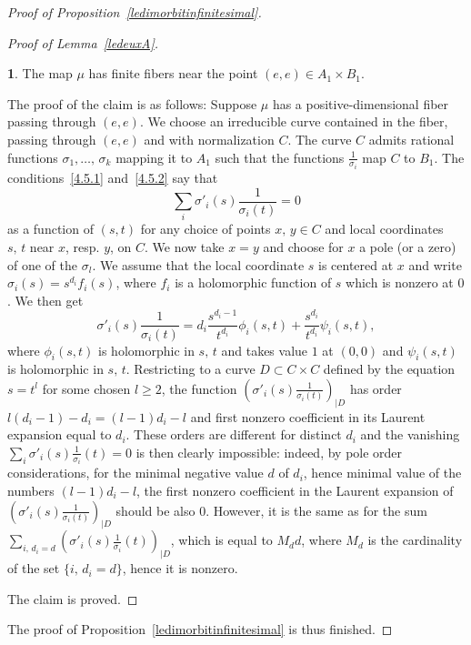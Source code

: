\documentclass[11pt]{article}
\theoremstyle{definition}
\newcommand{\enoncename}{}
\newtheorem{corpusenonce}[theo]{\enoncename}
\newenvironment{enonce}[2][]{\renewcommand{\enoncename}{#2}\begin{corpusenonce}}{\end{corpusenonce}}
\numberwithin{equation}{section}
\numberwithin{figure}{section}
\numberwithin{table}{section}
\begin{document}
\begin{proof}[Proof of Proposition~\ref{ledimorbitinfinitesimal}]
\begin{proof}[Proof of Lemma~\ref{ledeuxA}]
\begin{enonce}{Claim}\label{claim}
The map $\mu$ has finite fibers near the point $(e,e)\in A_1\times B_1$.
\end{enonce}

The proof of the claim is as follows: Suppose $\mu$ has a positive-dimensional fiber passing through $(e,e)$. We choose an irreducible curve contained in the fiber, passing through $(e,e)$ and with normalization $C$. The curve $C$ admits rational functions $\sigma_1,\dots,\,\sigma_k$ mapping it to $A_1$ such that the functions $\frac{1}{\sigma_i}$ map $C$ to $B_1$.
The conditions~\eqref{4.5.1} and~\eqref{4.5.2} say that
\[
\sum_i\sigma'_i(s)\frac{1}{\sigma_i(t)}=0
\]
as a function of $(s,t)$ for any choice of points $x,\,y\in C$ and local coordinates $s,\,t$ near $x$, resp. $y$, on $C$. We now take $x=y$ and choose for $x$ a pole (or a zero) of one of the $\sigma_l$. We assume that the local coordinate $s$ is centered at $x$ and write
$\sigma_i(s)=s^{d_i}f_i(s)$, where $f_i$ is a holomorphic function of $s$ which is nonzero at $0$. We then get
\begin{equation}\label{eqpourfonction}
\sigma'_i(s)\frac{1}{\sigma_i(t)}=d_i \frac{s^{d_i-1}}{t^{d_i}} \phi_i(s,t)+\frac{s^{d_i}}{t^{d_i}}\psi_i(s,t),
\end{equation}
where $\phi_i(s,t)$ is holomorphic in $s,\,t$ and takes value $1$ at $(0,0)$ and $\psi_i(s,t)$ is holomorphic in $s,\,t$. Restricting to a curve $D\subset C\times C$ defined by the equation $s=t^l$ for some chosen $l\geq2$, the function $(\sigma'_i(s)\frac{1}{\sigma_i(t)})_{\mid D}$ has order $l(d_i-1)-d_i=(l-1)d_i-l$ and first nonzero coefficient in its Laurent expansion equal to $d_i$. These orders are different for distinct $d_i$ and the vanishing $\sum_i\sigma'_i(s)\frac{1}{\sigma_i}(t)=0$ is then clearly impossible: indeed, by pole order considerations, for the minimal negative value $d$ of $d_i$, hence minimal value of the numbers $(l-1)d_i-l$, the first nonzero coefficient in the Laurent expansion of $(\sigma'_i(s)\frac{1}{\sigma_i(t)})_{\mid D}$ should be also $0$. However, it is the same as for the sum $\sum_{i,\,d_i=d}(\sigma'_i(s)\frac{1}{\sigma_i}(t))_{\mid D}$, which is equal to $M_d d$, where $M_d$ is the cardinality of the set $\{i,\,d_i=d\}$, hence it is nonzero.

The claim is proved.
\end{proof}

The proof of Proposition~\ref{ledimorbitinfinitesimal} is thus finished.
\end{proof}
\end{document}

